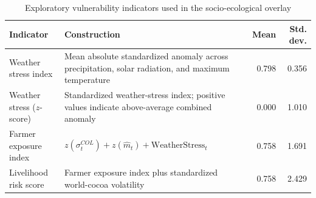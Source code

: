 \begin{table}
\caption{Exploratory vulnerability indicators used in the socio-ecological overlay}
\label{tab:vulnerability_indicators}
\begin{tabular}{llrr}
\toprule
Indicator & Construction & Mean & Std. dev. \\
\midrule
Weather stress index & Mean absolute standardized anomaly across precipitation, solar radiation, and maximum temperature & 0.798 & 0.356 \\
Weather stress ($z$-score) & Standardized weather-stress index; positive values indicate above-average combined anomaly & 0.000 & 1.010 \\
Farmer exposure index & $z(\sigma^{COL}_t) + z(\widehat{m}_t) + \mathrm{WeatherStress}_t$ & 0.758 & 1.691 \\
Livelihood risk score & Farmer exposure index plus standardized world-cocoa volatility & 0.758 & 2.429 \\
\bottomrule
\end{tabular}
\end{table}
